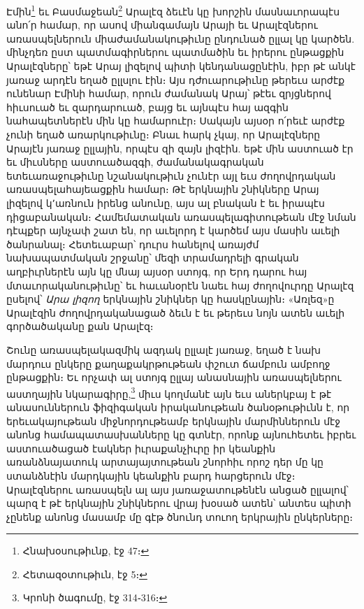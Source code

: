 \documentclass{article}
\begin{document}
{Էմին\footnote{Հնախօսութիւնք, էջ 47։} եւ Բասմաջեան\footnote{Հետազօտութիւն, էջ 5։} Արալէզ ձեւէն կը խորշին մասնաւորապէս անո՛ր համար, որ ասով միանգամայն Արայի եւ Արալէզներու առասպելներուն միաժամանակութիւնը ընդունած ըլլալ կը կարծեն. մինչդեռ ըստ պատմագիրներու պատմածին եւ իրերու ընթացքին Արալէզները՝ եթէ Արայ լիզելով պիտի կենդանացընէին, իբր թէ անկէ յառաջ արդէն եղած ըլլսլու էին։ Այս դժուարութիւնը թերեւս արժէք ունենար Էմինի համար, որուն ժամանակ Արայ՝ թէեւ զրյցներով հիւսուած եւ զարդարուած, բայց եւ այնպէս հայ ազգին նահապետներէն մին կը համարուէր։ Սակայն այսօր ո՛րեւէ արժէք չունի եղած առարկութիւնը։ Բնաւ հարկ չկայ, որ Արալէզները Արայէն յառաջ ըլլային, որպէս զի զայն լիզէին. եթէ մին աստուած էր եւ միւսները աստուածազգի, ժամանակագրական ետեւառաջութիւնը նշանակութիւն չունէր այլ եւս ժողովրդական առասպելահայեացքին համար։ Թէ երկնային շնիկները Արայ լիզելով կ՚առնուն իրենց անունը, այս ալ բնական է եւ իրապէս դիցաբանական։ Համեմատական առասպելագիտութեան մէջ նման դէպքեր այնչափ շատ են, որ աւելորդ է կարծեմ այս մասին աւելի ծանրանալ։ Հետեւաբար՝ դուրս հանելով առայժմ նախապատմական շրջանը՝ մեզի տրամադրելի գրական աղբիւրներէն այն կը մնայ այսօր ստոյգ, որ Երդ դարու հայ մտաւորականութիւնը՝ եւ հաւանօրէն նաեւ հայ ժողովուրդը Արալէզ ըսելով՝ \emph{Արա լիզող} երկնային շնիկներ կը հասկընային։ «Առլեզ»ը Արալէզին ժողովրդականացած ձեւն է եւ թերեւս նոյն ատեն աւելի գործածականը քան Արալէզ։

Շունը առասպելակազմիկ ազդակ ըլլալէ յառաջ, եղած է նախ մարդուս ընկերը քաղաքակրթութեան փշուտ ճամբուն ամբողջ ընթացքին։ Եւ որչափ ալ ստոյգ ըլլայ անասնային առասպելներու աստղային նկարագիրը,\footnote{Կրոնի ծագումը, էջ 314֊316։} միւս կողմանէ այն եւս աներկբայ է թէ անասուններուն ֆիզիգական իրականութեան ծանօթութիւնն է, որ երեւակայութեան միջնորդութեամբ երկնային մարմիններուն մէջ անոնց համապատասխանները կը գտնէր, որոնք այնուհետեւ իբրեւ աստուածացած էակներ իւրաքանչիւրը իր կեանքին առանձնայատուկ արտայայտութեան շնորհիւ որոշ դեր մը կը ստանձնէին մարդկային կեանքին բարդ հարցերուն մէջ։ Արալէզներու առասպելն ալ այս յառաջատութենէն անցած ըլլալով՝ պարզ է թէ երկնային շնիկներու վրայ խօսած ատեն՝ անտես պիտի չընենք անոնց մասամբ մը գէթ ծնունդ տուող երկրային ընկերները։

}
\end{document}
